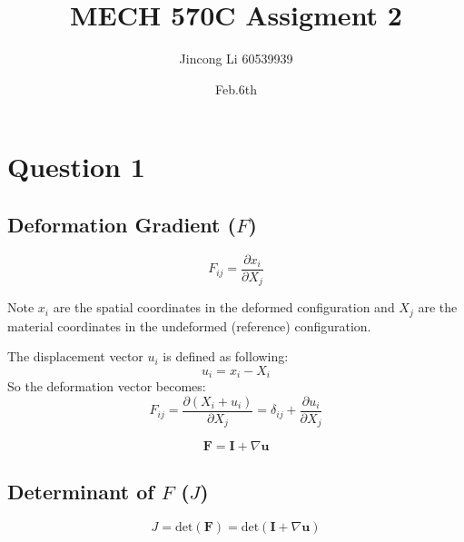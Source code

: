 \documentclass[a4paper,12pt]{article} %
\begin{document}
\setlength{\parskip}{1em} 
\setlength{\parindent}{0pt}
\newcommand{\vect}[1]{\mathbf{#1}}

\title{MECH 570C Assigment 2}
\author{Jincong Li 60539939}
\date{Feb.6th}
\maketitle
\section{\textbf{Question 1}}


\subsection{Deformation Gradient (\(F\))}

\[ F_{ij} = \frac{\partial x_i}{\partial X_j} \]

Note \(x_i\) are the spatial coordinates in the deformed configuration and \(X_j\) are the material coordinates in the undeformed (reference) configuration.

The displacement vector \(u_i\) is defined as following:
\[ u_i = x_i - X_i \]
So the deformation vector becomes:
\[ F_{ij} = \frac{\partial (X_i + u_i)}{\partial X_j} = \delta_{ij} + \frac{\partial u_i}{\partial X_j} \]

\[ \vect{F} = \vect{I} + \nabla \vect{u} \]


\subsection{Determinant of \(F\) (\(J\))}

\[ J = \text{det}(\vect{F}) = \text{det}(\vect{I} + \nabla \vect{u}) \]
\end{document}
